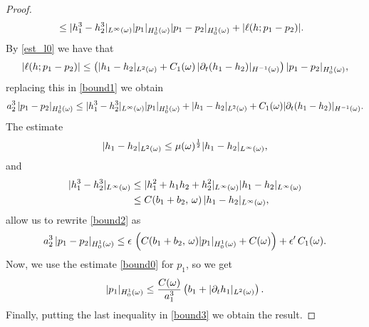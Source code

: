 \begin{theorem}
\begin{proof}
\begin{align}
&\leq |h_1^3-h_2^3|_\lpom{\infty} |p_1|_\hzerooneom|p_1-p_2|_\hzerooneom + |\ell(h;p_1-p_2)|.\label{eq:bound1}
\end{align}
By \eqref{est_l0} we have that
\begin{align*}
|\ell(h;p_1-p_2)|\leq \left(|h_1-h_2|_{L^{2}(\omega)}+C_1(\omega)\,|\partial_t(h_1-h_2)|_{H^{-1}(\omega)}\right)|p_1-p_2|_{H_0^1(\omega)},
\end{align*}
replacing this in \eqref{bound1} we obtain
\begin{align}
a_2^3\,|p_1-p_2|_\hzerooneom\leq|h_1^3-h_2^3|_\lpom{\infty}|p_1|_\hzerooneom +|h_1-h_2|_\lpom{2}+C_1(\omega)|\partial_t(h_1-h_2)|_{H^{-1}(\omega)}.\label{eq:bound2}
\end{align}
The estimate
$$|h_1-h_2|_{L^{2}(\omega)}\leq \mu(\omega)^\frac{1}{2}|h_1-h_2|_{L^{\infty}(\omega)},$$ and 
\begin{align*}
|h_1^3-h_2^3|_{L^{\infty}(\omega)}&\leq |h_1^2+h_1h_2+h_2^2|_{L^{\infty}(\omega)}|h_1-h_2|_{L^{\infty}(\omega)}\\&\leq C(b_1+b_2,\,\omega)\,|h_1-h_2|_{L^{\infty}(\omega)},
\end{align*}
allow us to rewrite \eqref*{bound2} as
\begin{align}
a_2^3\,|p_1-p_2|_\hzerooneom \leq \epsilon\, \left(C(b_1+b_2,\,\omega)|p_1|_\hzerooneom +C(\omega)\right)+\epsilon'\,C_1(\omega).\label{eq:bound3}
\end{align}
Now, we use the estimate \eqref*{bound0} for $p_1$, so we get
$$|p_1|_{H_0^1(\omega)} \leq \frac{C(\omega)}{a_1^3}\left(b_1+|\partial_t h_1|_{L^{2}(\omega)}\right).$$Finally, putting the last inequality in \eqref{bound3} we obtain the result.
\end{proof}
\end{theorem}

